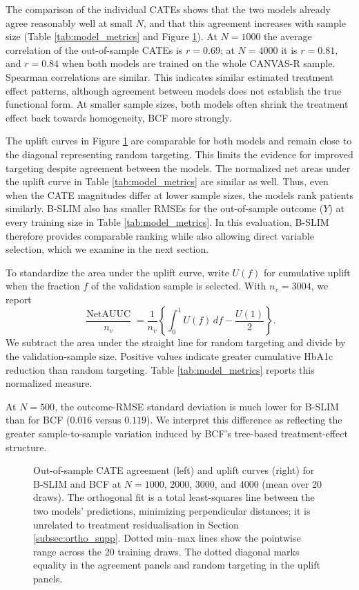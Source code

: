 \documentclass[12pt]{article}
\begin{document}
The comparison of the individual CATEs shows that the two models already agree reasonably well at small $N$, and that this agreement increases with sample size (Table \ref{tab:model_metrics} and Figure \ref{fig:cv_dashboards}). At $N=1000$ the average correlation of the out-of-sample CATEs is $r = 0.69$; at $N=4000$ it is $r = 0.81$, and $r = 0.84$ when both models are trained on the whole CANVAS-R sample. Spearman correlations are similar. This indicates similar estimated treatment effect patterns, although agreement between models does not establish the true functional form. At smaller sample sizes, both models often shrink the treatment effect back towards homogeneity, BCF more strongly.

The uplift curves in Figure \ref{fig:cv_dashboards} are comparable for both models and remain close to the diagonal representing random targeting. This limits the evidence for improved targeting despite agreement between the models. The normalized net areas under the uplift curve in Table \ref{tab:model_metrics} are similar as well. Thus, even when the CATE magnitudes differ at lower sample sizes, the models rank patients similarly. B-SLIM also has smaller RMSEs for the out-of-sample outcome ($Y$) at every training size in Table \ref{tab:model_metrics}. In this evaluation, B-SLIM therefore provides comparable ranking while also allowing direct variable selection, which we examine in the next section.

To standardize the area under the uplift curve, write $U(f)$ for cumulative uplift when the fraction $f$ of the validation sample is selected. With $n_v=3004$, we report
\[
 \frac{\operatorname{NetAUUC}}{n_v}
 =\frac{1}{n_v}\left\{\int_0^1 U(f)\,df-\frac{U(1)}{2}\right\}.
\]
We subtract the area under the straight line for random targeting and divide by the validation-sample size. Positive values indicate greater cumulative HbA1c reduction than random targeting. Table \ref{tab:model_metrics} reports this normalized measure.

At $N=500$, the outcome-RMSE standard deviation is much lower for B-SLIM than for BCF ($0.016$ versus $0.119$). We interpret this difference as reflecting the greater sample-to-sample variation induced by BCF's tree-based treatment-effect structure.

\begin{figure}[htbp]
    \centering
    
    \caption{Out-of-sample CATE agreement (left) and uplift curves (right) for B-SLIM and BCF at $N=1000$, $2000$, $3000$, and $4000$ (mean over 20 draws). The orthogonal fit is a total least-squares line between the two models' predictions, minimizing perpendicular distances; it is unrelated to treatment residualisation in Section \ref{subsec:ortho_supp}. Dotted min--max lines show the pointwise range across the 20 training draws. The dotted diagonal marks equality in the agreement panels and random targeting in the uplift panels.}
    \label{fig:cv_dashboards}
\end{figure}
\end{document}
